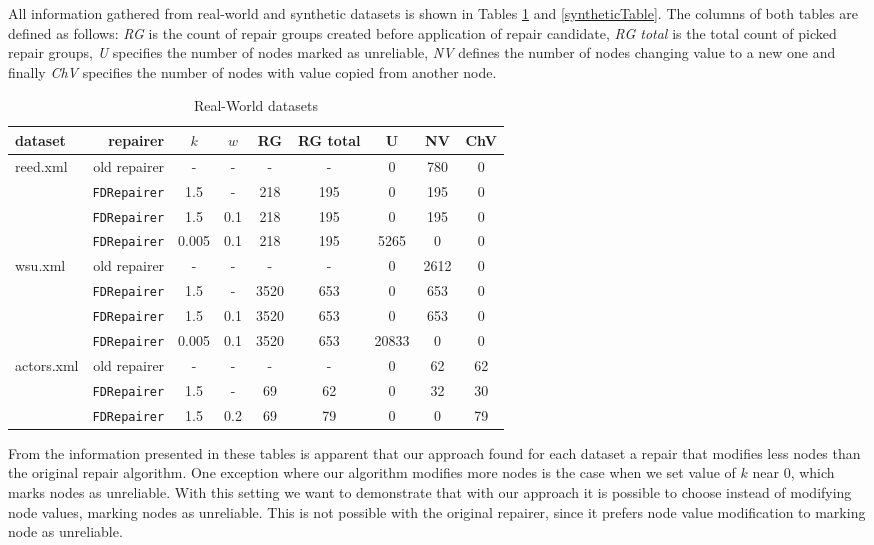 All information gathered from real-world and synthetic datasets is shown in Tables \ref{realWorldTable} and \ref{syntheticTable}. The columns of both tables are defined as follows: \emph{RG} is the count of repair groups created before application of repair candidate, \emph{RG total} is the total count of picked repair groups, \emph{U} specifies the number of nodes marked as unreliable, \emph{NV} defines the number of nodes changing value to a new one and finally \emph{ChV} specifies the number of nodes with value copied from another node.\\


\begin{table}
    \begin{tabular}{| l | r | *{7}{c|}}
    \hline
    dataset & repairer & $k$ & $w$ & RG & RG total & U & NV & ChV\\ \hline
    \multirow{4}{*}{reed.xml} & old repairer & - & - & - & - & 0 & 780 & 0\\
    & \texttt{FDRepairer} & 1.5 & - & 218 & 195 & 0 & 195 & 0\\
    & \texttt{FDRepairer} & 1.5 & 0.1 & 218 & 195 & 0 & 195 & 0\\
    & \texttt{FDRepairer} & 0.005 & 0.1 & 218 & 195 & 5265 & 0 & 0\\ \hline
    \multirow{4}{*}{wsu.xml} & old repairer & - & - & - & - & 0 & 2612 & 0\\
    & \texttt{FDRepairer} & 1.5 & - & 3520 & 653 & 0 & 653 & 0\\
    & \texttt{FDRepairer} & 1.5 & 0.1 & 3520 & 653 & 0 & 653 & 0\\
    & \texttt{FDRepairer} & 0.005 & 0.1 & 3520 & 653 & 20833 & 0 & 0\\ \hline
    \multirow{3}{*}{actors.xml} & old repairer & - & - & - & - & 0 & 62 & 62\\
    & \texttt{FDRepairer} & 1.5 & - & 69 & 62 & 0 & 32 & 30\\
    & \texttt{FDRepairer} & 1.5 & 0.2 & 69 & 79 & 0 & 0 & 79\\ \hline
    \end{tabular}
\caption{Real-World datasets}
\label{realWorldTable}
\end{table}

From the information presented in these tables is apparent that our approach found for each dataset a repair that modifies less nodes than the original repair algorithm. One exception where our algorithm modifies more nodes is the case when we set value of $k$ near 0, which marks nodes as unreliable. With this setting we want to demonstrate that with our approach it is possible to choose instead of modifying node values, marking nodes as unreliable. This is not possible with the original repairer, since it prefers node value modification to marking node as unreliable.

